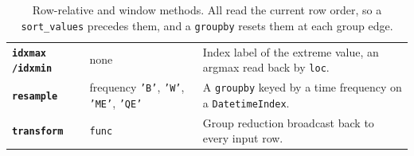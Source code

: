 \begin{table}[H]
\begin{tabularx}{\textwidth}{>{\raggedright\arraybackslash}p{} >{\raggedright\arraybackslash}p{} >{\raggedright\arraybackslash}X}
\textbf{\texttt{idxmax /\allowbreak idxmin}} & none & Index label of the extreme value, an argmax read back by \texttt{loc}. \\
\textbf{\texttt{resample}} & frequency \texttt{'B'}, \texttt{'W'}, \texttt{'ME'}, \texttt{'QE'} & A \texttt{groupby} keyed by a time frequency on a \texttt{DatetimeIndex}. \\
\textbf{\texttt{transform}} & \texttt{func} & Group reduction broadcast back to every input row. \\
\bottomrule
\end{tabularx}
\caption*{Row-relative and window methods. All read the current row order, so a \texttt{sort\_values} precedes them, and a \texttt{groupby} resets them at each group edge.}
\end{table}

\newpage
